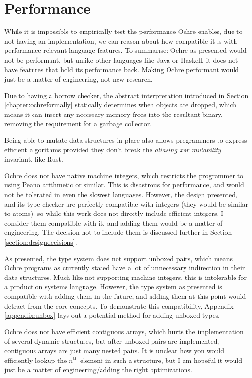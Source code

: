 \documentclass[12pt,twoside]{report}
\begin{document}
\section{Performance}
While it is impossible to empirically test the performance Ochre enables, due to not having an implementation, we can reason about how compatible it is with performance-relevant language features. To summarise: Ochre as presented would not be performant, but unlike other languages like Java or Haskell, it does not have features that hold its performance back. Making Ochre performant would just be a matter of engineering, not new research.

Due to having a borrow checker, the abstract interpretation introduced in Section \ref{chapter:ochreformally} statically determines when objects are dropped, which means it can insert any necessary memory frees into the resultant binary, removing the requirement for a garbage collector.

Being able to mutate data structures in place also allows programmers to express efficient algorithms provided they don't break the \textit{aliasing xor mutability} invariant, like Rust.

Ochre does not have native machine integers, which restricts the programmer to using Peano arithmetic or similar. This is disastrous for performance, and would not be tolerated in even the slowest languages. However, the design presented, and its type checker are perfectly compatible with integers (they would be similar to atoms), so while this work does not directly include efficient integers, I consider them compatible with it, and adding them would be a matter of engineering. The decision not to include them is discussed further in Section \ref{section:designdecisions}.

As presented, the type system does not support unboxed pairs, which means Ochre programs as currently stated have a lot of unnecessary indirection in their data structures. Much like not supporting machine integers, this is intolerable for a production systems language. However, the type system as presented is compatible with adding them in the future, and adding them at this point would detract from the core concepts. To demonstrate this compatibility, Appendix \ref{appendix:unbox} lays out a potential method for adding unboxed types.

Ochre does not have efficient contiguous arrays, which hurts the implementation of several dynamic structures, but after unboxed pairs are implemented, contiguous arrays are just many nested pairs. It is unclear how you would efficiently lookup the $n^{\text{th}}$ element in such a structure, but I am hopeful it would just be a matter of engineering/adding the right optimizations.
\end{document}
